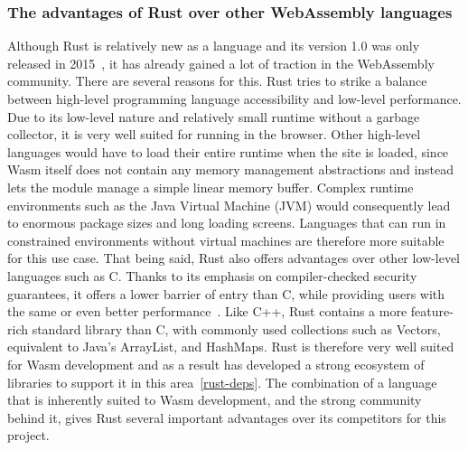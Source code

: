 \subsubsection{The advantages of Rust over other WebAssembly languages} \label{rust-vs-other-wasm}
Although Rust is relatively new as a language and its version 1.0 was only released in 2015~\cite{rustreleases}, it has already gained a lot of traction in the WebAssembly community.
There are several reasons for this. Rust tries to strike a balance between high-level programming language accessibility and low-level performance.
Due to its low-level nature and relatively small runtime without a garbage collector, it is very well suited for running in the browser.
Other high-level languages would have to load their entire runtime when the site is loaded, since Wasm itself does not contain any memory management abstractions and instead lets the module manage a simple linear memory buffer.
Complex runtime environments such as the Java Virtual Machine (JVM) would consequently lead to enormous package sizes and long loading screens.
Languages that can run in constrained environments without virtual machines are therefore more suitable for this use case.
That being said, Rust also offers advantages over other low-level languages such as C. Thanks to its emphasis on compiler-checked security guarantees, it offers a lower barrier of entry than C, while providing users with the same or even better performance~\cite{medin2021performance}.
Like C++, Rust contains a more feature-rich standard library than C, with commonly used collections such as Vectors, equivalent to Java's ArrayList, and HashMaps.
Rust is therefore very well suited for Wasm development and as a result has developed a strong ecosystem of libraries to support it in this area~\ref{rust-deps}.
The combination of a language that is inherently suited to Wasm development, and the strong community behind it, gives Rust several important advantages over its competitors for this project.


